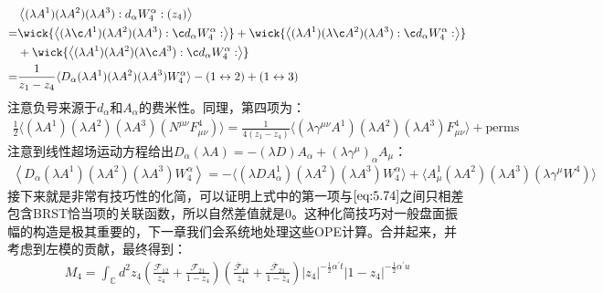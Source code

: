 \begin{equation}
	\begin{aligned}
		&\left\langle(\lambda A^1)(\lambda A^2)(\lambda A^3):d_\alpha W_4^\alpha:(z_4)\right\rangle\\
		=&\wick{\left\langle(\lambda \c A^1)(\lambda A^2)(\lambda A^3): \c d_\alpha W_4^\alpha:\right\rangle}+\wick{\left\langle(\lambda  A^1)(\lambda\c A^2)(\lambda A^3): \c d_\alpha W_4^\alpha:\right\rangle}\\
		&+\wick{\left\langle(\lambda  A^1)(\lambda A^2)(\lambda\c A^3):\c d_\alpha  W_4^\alpha:\right\rangle}\\
		=&\frac{1}{z_1-z_4}\langle D_\alpha(\lambda A^1)(\lambda A^2)(\lambda A^3)W_4^\alpha\rangle-(1\leftrightarrow2)+(1\leftrightarrow3)
	\end{aligned}
\end{equation}
注意负号来源于$d_\alpha$和$A_\alpha$的费米性。同理，第四项为：
\begin{equation}
	\label{eq:5.74}
	\begin{aligned}
		\frac{1}{2}\big\langle(\lambda A^1)(\lambda A^2)(\lambda A^3)(N^{\mu\nu}F_{\mu\nu}^4)\big\rangle
		= \frac{1}{4(z_1-z_4)}\big\langle(\lambda\gamma^{\mu\nu}A^1)(\lambda A^2)(\lambda A^3)F_{\mu\nu}^4\big\rangle + \text{perms}
	\end{aligned}
\end{equation}
注意到线性超场运动方程给出$D_\alpha(\lambda A)=-(\lambda D)A_\alpha+(\lambda\gamma^\mu)_\alpha A_\mu$：
\begin{equation}
	\begin{aligned}
		\left\langle D_\alpha(\lambda A^1)(\lambda A^2)(\lambda A^3)W_4^\alpha\right\rangle=-\langle(\lambda DA_\alpha^1)(\lambda A^2)(\lambda A^3)W_4^\alpha\rangle+\langle A_\mu^1(\lambda A^2)(\lambda A^3)(\lambda\gamma^\mu W^4)\rangle
	\end{aligned}
\end{equation}
接下来就是非常有技巧性的化简，可以证明上式中的第一项与$\ref{eq:5.74}$之间只相差包含BRST恰当项的关联函数，所以自然差值就是$0$。这种化简技巧对一般盘面振幅的构造是极其重要的，下一章我们会系统地处理这些OPE计算。合并起来，并考虑到左模的贡献，最终得到：
\begin{equation}
	\begin{aligned}
		M_4=\int_\mathbb{C} d^2z_4\left(\frac{\mathcal{F}_{12}}{z_4}+\frac{\mathcal{F}_{21}}{1-z_4}\right)\left(\frac{\overline{\mathcal{F}}_{12}}{\overline{z}_4}+\frac{\overline{\mathcal{F}}_{21}}{1-\overline{z}_4}\right)|z_4|^{-\frac{1}{2}\alpha^{\prime}t}|1-z_4|^{-\frac{1}{2}\alpha^{\prime}u}
	\end{aligned}
\end{equation}
